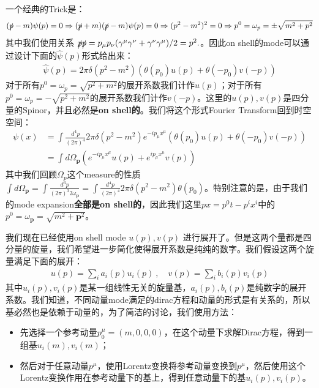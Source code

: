 一个经典的Trick是：
\begin{align}
  (\slashed{p}-m)\psi(p)=0 \Rightarrow (\slashed{p}+m)
  (\slashed{p}-m)\psi(p)=0 \Rightarrow (p^2 -
  m^2)^2 = 0 \Rightarrow p^0 = \omega_p =\pm\sqrt{m^2+p^2}
\end{align}
其中我们使用关系 $ \slashed{p}\slashed{p}=p_\mu
p_\nu(\gamma^\mu\gamma^\nu+\gamma^\nu\gamma^\mu)/2=p^2. $。因此on
shell的mode可以通过设计下面的$ \hat{\psi}(p) $形式给出来：
\begin{align}
  \hat{\psi}(p)=2\pi\delta(p^2-m^2)\left(\theta(p_0)u(p)+\theta(-p_0)v(-p)\right)
\end{align}
对于所有$ p^0 = \omega_p = \sqrt{p^2 + m^2} $的展开系数我们计作$ u(p) $；对于所有$ p^0
= \omega_p = -\sqrt{p^2 + m^2} $的展开系数我们计作$ v(-p) $。这里的$ u(p),v(p)
$是四分量的Spinor，并且必然是\textbf{on shell的}。我们将这个形式Fourier Transform回到时空空间：
\begin{align}
  \psi(x)&=\int\frac{d^4p}{(2\pi)^4}\left.2\pi\delta(p^2-m^2)e^{-ip_\mu
  x^\mu}\left(\theta(p_0)u(p)+\theta(-p_0)v(-p)\right)\right.\\
  &= \int d\Omega_{\mathbf{p}}\left(e^{-ip_\mu x^\mu}u(p)+e^{ip_\mu
  x^\mu}v(p)\right)
\end{align}
其中我们回顾$ \Omega_p $这个measure的性质$  \int d\Omega_{\mathbf{p}} = \int
\frac{d^3p}{(2\pi)^3 2\omega_{\mathbf{p}}} =\int
\frac{d^4p}{(2\pi)^4}2 \pi \delta(p^2-m^2)\theta(p_0)
$。特别注意的是，由于我们的mode expansion\textbf{全部是on shell的}，因此我们这里$ px = p^0 t
- p^i x^i $中的$ p^0 = \omega_{\mathbf{p}} = \sqrt{m^2 + \mathbf{p}^2} $。

\bigskip
{}

我们现在已经使用on shell mode $ u(p), v(p) $
进行展开了。但是这两个量都是四分量的旋量，我们希望进一步简化使得展开系数是纯纯的数字。我们假设这两个旋量满足下面的展开：
\begin{align}
  u(p)=\sum_ia_i(p)u_i(p)\mathrm{~,}\quad v(p)=\sum_ib_i(p)v_i(p)
\end{align}
其中$ u_i(p), v_i(p) $是某一组线性无关的旋量基，$ a_i(p), b_i(p)
$是纯数字的展开系数。我们知道，不同动量mode满足的dirac方程和动量的形式是有关系的，所以基必然也是依赖于动量的，为了简洁的讨论，我们使用方法：
\begin{itemize}
  \item 先选择一个参考动量$ p_0^\mu = (m,0,0,0) $，在这个动量下求解Dirac方程，得到一组基$
    u_i(m), v_i(m) $；
  \item 然后对于任意动量$ p^\mu $，使用Lorentz变换将参考动量变换到$ p^\mu
    $，然后使用这个Lorentz变换作用在参考动量下的基上，得到任意动量下的基$ u_i(p), v_i(p) $。
\end{itemize}

